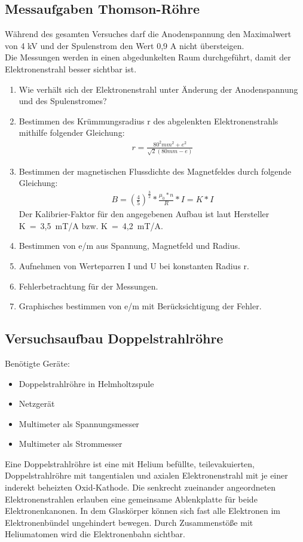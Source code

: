 \documentclass[a4paper,10pt]{scrartcl}
\begin{document}
	\subsection{Messaufgaben Thomson-Röhre}
	Während des gesamten Versuches darf die Anodenspannung den Maximalwert von 4 kV und der Spulenstrom den Wert 0,9 A nicht übersteigen. \\
	Die Messungen werden in einen abgedunkelten Raum durchgeführt, damit der Elektronenstrahl besser sichtbar ist.
	\begin{enumerate}
\item Wie verhält sich der Elektronenstrahl unter Änderung der Anodenspannung und des Spulenstromes?
\item Bestimmen des Krümmungsradius r des abgelenkten Elektronenstrahls mithilfe folgender Gleichung:
\begin{align*}
r=\frac{80^2mm^2+e^2}{\sqrt{2}(80mm-e)}
\end{align*}
\item Bestimmen der magnetischen Flussdichte des Magnetfeldes durch folgende Gleichung:
\begin{align*}
B=(\frac{4}{5})^{\frac{3}{2}}*\frac{{\mu}_0*n}{R}*I=K*I
\end{align*}
Der Kalibrier-Faktor für den angegebenen Aufbau ist laut Hersteller K~=~3,5~mT/A bzw.
K~=~4,2~mT/A.
\item Bestimmen von e/m aus Spannung, Magnetfeld und Radius.
\item Aufnehmen von Werteparren I und U bei konstanten Radius r.
\item Fehlerbetrachtung für der Messungen.
\item Graphisches bestimmen von e/m mit Berücksichtigung der Fehler.
\end{enumerate}
	
	\subsection{Versuchsaufbau Doppelstrahlröhre}
	Benötigte Geräte:
	\begin{itemize}
\item Doppelstrahlröhre in Helmholtzspule
\item Netzgerät
\item Multimeter als Spannungsmesser
\item Multimeter als Strommesser
\end{itemize}
Eine Doppelstrahlröhre ist eine mit Helium befüllte, teilevakuierten, Doppelstrahlröhre mit tangentialen und axialen Elektronenstrahl mit je einer inderekt beheizten Oxid-Kathode. Die senkrecht zueinander
angeordneten Elektronenstrahlen erlauben eine gemeinsame Ablenkplatte für beide Elektronenkanonen. In dem Glaskörper können sich fast alle Elektronen im Elektronenbündel ungehindert bewegen. 
Durch Zusammenstöße mit Heliumatomen wird die Elektronenbahn sichtbar.
\end{document}
